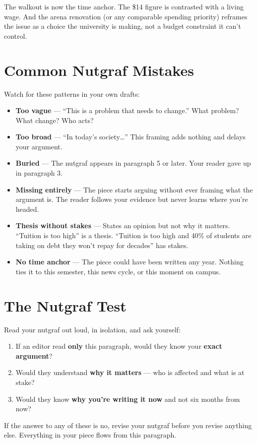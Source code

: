 \documentclass[12pt]{article}
\begin{document}
The walkout is now the time anchor. The \$14 figure is contrasted with a living wage. And the arena renovation (or any comparable spending priority) reframes the issue as a choice the university is making, not a budget constraint it can't control.

\newpage
\section*{Common Nutgraf Mistakes}

Watch for these patterns in your own drafts:

\begin{itemize}[leftmargin=*]
    \item \textbf{Too vague} --- ``This is a problem that needs to change.'' What problem? What change? Who acts?
    \item \textbf{Too broad} --- ``In today's society\ldots'' This framing adds nothing and delays your argument.
    \item \textbf{Buried} --- The nutgraf appears in paragraph 5 or later. Your reader gave up in paragraph 3.
    \item \textbf{Missing entirely} --- The piece starts arguing without ever framing what the argument is. The reader follows your evidence but never learns where you're headed.
    \item \textbf{Thesis without stakes} --- States an opinion but not why it matters. ``Tuition is too high'' is a thesis. ``Tuition is too high and 40\% of students are taking on debt they won't repay for decades'' has stakes.
    \item \textbf{No time anchor} --- The piece could have been written any year. Nothing ties it to this semester, this news cycle, or this moment on campus.
\end{itemize}

\section*{The Nutgraf Test}

\begin{tipbox}
Read your nutgraf out loud, in isolation, and ask yourself:

\begin{enumerate}[leftmargin=*]
    \item If an editor read \textbf{only} this paragraph, would they know your \textbf{exact argument}?
    \item Would they understand \textbf{why it matters} --- who is affected and what is at stake?
    \item Would they know \textbf{why you're writing it now} and not six months from now?
\end{enumerate}

If the answer to any of these is no, revise your nutgraf before you revise anything else. Everything in your piece flows from this paragraph.
\end{tipbox}
\end{document}

